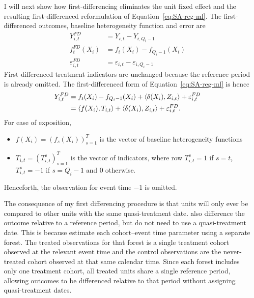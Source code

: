 \documentclass[12pt,notitlepage]{article}
\renewcommand{\eqref}[1]{Equation~\ref{#1}}
\begin{document}
I will next show how first-differencing eliminates the unit fixed effect and the resulting first-differenced reformulation of \eqref{eq:SA-reg-ml}.
The first-differenced outcomes, baseline heterogeneity function and error are 
\begin{align*}
   Y_{i,t}^{FD} &= Y_{i,t} - Y_{i,Q_i-1} \\ 
   f_{t}^{FD}(X_i) &= f_{t}(X_i) - f_{Q_i - 1}(X_i)\\
\varepsilon_{i,t}^{FD} &= \varepsilon_{i,t} - \varepsilon_{i,Q_i-1}
\end{align*}
First-differenced treatment indicators are unchanged because the reference period is already omitted. 
The first-differenced form of \eqref{eq:SA-reg-ml} is hence 
\begin{align} \label{eq:SA-reg-ml-fd}
Y_{i,t}^{FD} &= f_t(X_i) - f_{Q_i - 1}(X_i) + \langle \delta(X_i) , Z_{i,t} \rangle + \varepsilon_{i,t}^{FD} \notag \\ 
&= \langle f(X_i) , T_{i,t} \rangle  + \langle \delta(X_i) , Z_{i,t} \rangle + \varepsilon_{i,t}^{FD}.
\end{align}
For ease of exposition,
\begin{itemize}
    \item $f(X_i) = \left(f_s(X_i)\right)_{s = 1}^{T}$ is the vector of baseline heterogeneity functions
    \item $T_{i,t} = \left(T_{i,t}^s\right)_{s = 1}^{T}$ is the vector of indicators, where row $T_{i,t}^s = 1$ if $s=t$, $T_{i,t}^s = -1$ if $s=Q_i - 1$ and $0$ otherwise. 
\end{itemize}
Henceforth, the observation for event time $-1$ is omitted. 

The consequence of my first differencing procedure is that units will only ever be compared to other units with the same quasi-treatment date. 
\cite{gavrilova_difference--difference_2025} also difference the outcome relative to a reference period, but do not need to use a quasi-treatment date. 
This is because \cite{gavrilova_difference--difference_2025} estimate each cohort–event time parameter using a separate forest.
The treated observations for that forest is a single treatment cohort observed at the relevant event time and the control observations are the never-treated cohort observed at that same calendar time. 
Since each forest includes only one treatment cohort, all treated units share a single reference period, allowing outcomes to be differenced relative to that period without assigning quasi-treatment dates. 
\end{document}
